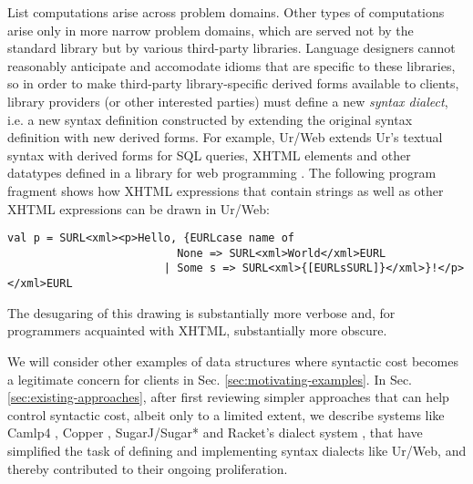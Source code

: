 List computations arise across problem domains. Other types of computations arise only in more narrow problem domains, which are served not by the standard library but by various third-party libraries. Language designers cannot reasonably anticipate and accomodate idioms that are specific to these libraries, so in order to make third-party library-specific derived forms available to clients, library providers (or other interested parties) must define a new \emph{syntax dialect}, i.e. a new syntax definition constructed by extending the original syntax definition with new derived forms. For example, Ur/Web extends Ur's textual syntax with derived forms for SQL queries, XHTML elements and other datatypes defined in a library for web programming \cite{conf/popl/Chlipala15}. The  following program fragment shows how XHTML expressions that contain strings as well as other XHTML expressions can be drawn in Ur/Web: %
\begin{lstlisting}[numbers=none]
val p = SURL<xml><p>Hello, {EURLcase name of
                          None => SURL<xml>World</xml>EURL
                        | Some s => SURL<xml>{[EURLsSURL]}</xml>}!</p></xml>EURL
\end{lstlisting}                              
The desugaring of this drawing is substantially more verbose and, for programmers  acquainted with XHTML, substantially more obscure.

We will consider other examples of data structures where syntactic cost becomes a legitimate concern for clients in Sec. \ref{sec:motivating-examples}. In Sec. \ref{sec:existing-approaches}, after first reviewing simpler approaches that can help control syntactic cost, albeit only to a limited extent, we describe systems like Camlp4 \cite{ocaml-manual}, Copper \cite{conf/gpce/WykS07}, SugarJ/Sugar* \cite{erdweg2011sugarj,erdweg2013framework} and Racket's dialect system \cite{Flatt:2012:CLR:2063176.2063195}, that have simplified the task of defining and implementing syntax dialects like Ur/Web, and thereby contributed to their ongoing proliferation.



